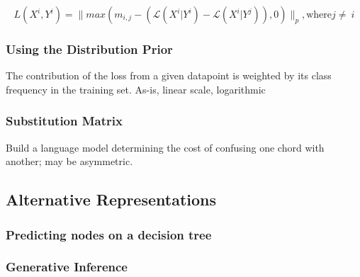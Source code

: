 \begin{equation}
L(X^i, Y^i) = \| max(m_{i,j} - (\mathcal{L}(X^i|Y^i) - \mathcal{L}(X^i|Y^j)), 0) \|_p, \text{where} j\neq~i
\label{eq:collisions}
\end{equation}


\subsubsection{Using the Distribution Prior}
The contribution of the loss from a given datapoint is weighted by its class frequency in the training set.
As-is, linear scale, logarithmic

\subsubsection{Substitution Matrix}
Build a language model determining the cost of confusing one chord with another; may be asymmetric.


\subsection{Alternative Representations}

\subsubsection{Predicting nodes on a decision tree}

\subsubsection{Generative Inference}




